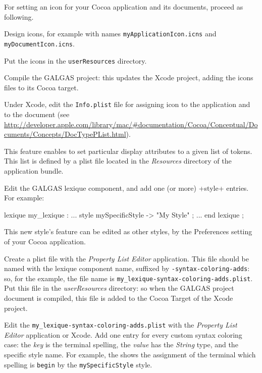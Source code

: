 For setting an icon for your Cocoa application and its documents, proceed as following.



 Design icons, for example with names \texttt{myApplicationIcon.icns} and \texttt{myDocumentIcon.icns}.

 Put the icons in the \texttt{userResources} directory.

 Compile the GALGAS project: this updates the Xcode project, adding the icons files to its Cocoa target.

 Under Xcode, edit the \texttt{Info.plist} file for assigning icon to the application and to the document (see \url{http://developer.apple.com/library/mac/#documentation/Cocoa/Conceptual/Documents/Concepts/DocTypePList.html}).












This feature enables to set particular display attributes to a given list of tokens. This list is defined by a plist file located in the \emph{Resources} directory of the application bundle.

 Edit the GALGAS lexique component, and add one (or more) \ggs+style+ entries. For example:

\begin{galgascode}
lexique my_lexique :
  ...
style mySpecificStyle -> "My Style" ;
  ...
end lexique ;
\end{galgascode}

This new style's feature can be edited as other styles, by the Preferences setting of your Cocoa application.


 Create a plist file with the \emph{Property List Editor} application. This file should be named with the lexique component name, suffixed by \texttt{-syntax-coloring-adds}: so, for the example, the file name is \texttt{my\_lexique-syntax-coloring-adds.plist}. Put this file in the \emph{userResources} directory: so when the GALGAS project document is compiled, this file is added to the Cocoa Target of the Xcode project. 

 Edit the \texttt{my\_lexique-syntax-coloring-adds.plist} with the \emph{Property List Editor} application or Xcode. Add one entry for every custom syntax coloring case: the \emph{key} is the terminal spelling, the \emph{value} has the \emph{String} type, and the specific style name. For example, the  shows the assignment of the terminal which spelling is \texttt{begin} by the \texttt{mySpecificStyle} style.

